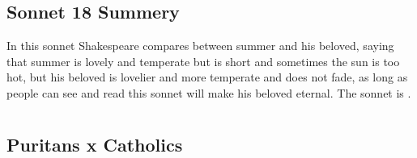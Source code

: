 \documentclass[12pt, a4paper]{article}
\begin{document}
\subsection*{Sonnet 18 Summery}
{\fontpar
In this sonnet Shakespeare compares between summer and his beloved, saying that summer is lovely and temperate
but is short and sometimes the sun is too hot, but his beloved is 
lovelier and more temperate and does not fade, as long as 
people can see and read this sonnet will make his beloved eternal. The 
sonnet is .
}

\section*{}

\subsection*{Puritans x Catholics}
\end{document}
